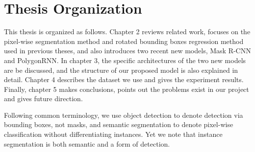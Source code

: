 \section{Thesis Organization}\label{thsorg}

This thesis is organized as follows. Chapter 2 reviews related work, focuses on the pixel-wise segmentation method and rotated bounding boxes regression method used in previous theses, and also introduces two recent new models, Mask R-CNN and PolygonRNN. In chapter 3, the specific architectures of the two new models are be discussed, and the structure of our proposed model is also explained in detail. Chapter 4 describes the dataset we use and gives the experiment results. Finally, chapter 5 makes conclusions, points out the problems exist in our project and gives future direction.

Following common terminology, we use object detection to denote detection via bounding boxes, not masks, and semantic segmentation to denote pixel-wise classification without differentiating instances. Yet we note that instance segmentation is both semantic and a form of detection.
